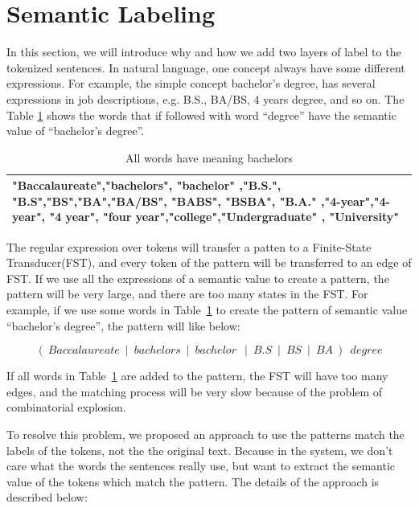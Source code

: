 \section{Semantic Labeling}

In this section, we will introduce why and how we add two layers of label to the tokenized sentences. In natural language, one concept always have some different expressions. For example, the simple concept bachelor's degree,  has several expressions in job descriptions, e.g. B.S., BA/BS, 4 years degree, and so on. The Table \ref{tab:multispelling} shows the words that if followed with word ``degree'' have the semantic value of ``bachelor's degree''.

\begin{table}[ht]
\caption{All words have meaning bachelors } %
\centering %
\begin{tabular}{  | p{15cm} |  }
 \hline
 "Baccalaureate","bachelors", "bachelor" ,"B.S.", "B.S","BS","BA","BA/BS", "BABS", "BSBA", "B.A." ,"4-year","4-year", "4 year", "four year","college","Undergraduate" , "University" \\
  \hline
\end{tabular}
\label{tab:multispelling} %
\end{table}

The regular expression over tokens will transfer a patten to a Finite-State Transducer(FST), and every token of the pattern will be transferred to an edge of FST. If we use all the expressions of a semantic value to create a pattern, the pattern will be very large, and there are too many states in the FST. For example, if we use some words in Table~\ref{tab:multispelling} to create the pattern of semantic value ``bachelor's degree'', the pattern will like below:

$$ (~Baccalaureate~\mid~bachelors~\mid~bachelor~~\mid~B.S~\mid~BS~\mid~BA~)~~degree $$

If all words in Table~\ref{tab:multispelling} are added to the pattern, the FST will have too many edges, and the matching process will be very slow because of the problem of combinatorial explosion.

To resolve this problem, we proposed an approach to use the patterns match the labels of the tokens, not the the original text. Because in the system, we don't care what the words the sentences really use, but want to extract the semantic value of the tokens which match the pattern. The details of the approach is described below:

